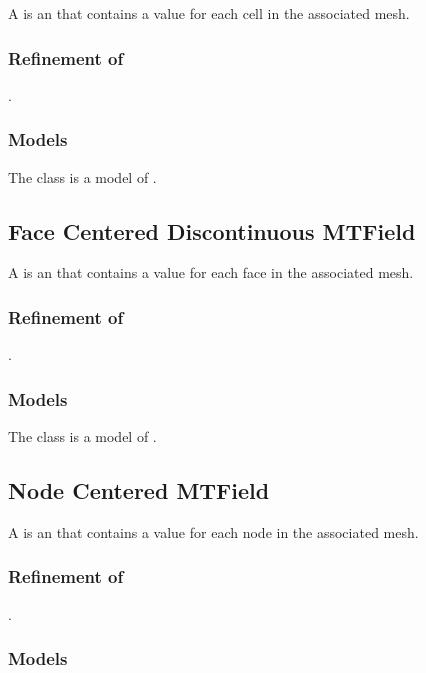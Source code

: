 \documentclass[11pt]{rnote}
\begin{document}
A  is an  that
contains a value for each cell in the associated mesh.

\subsubsection{Refinement of}
.

\subsubsection{Models}

The  class is a model of .

\subsection{Face Centered Discontinuous MTField}

A  is an
 that contains a value for each face in the
associated mesh.

\subsubsection{Refinement of}
.

\subsubsection{Models}

The  class is a model of .

\subsection{Node Centered MTField}

A  is an  that
contains a value for each node in the associated mesh.

\subsubsection{Refinement of}
.

\subsubsection{Models}
\end{document}
